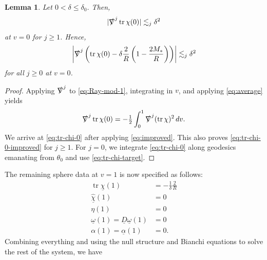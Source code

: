 \documentclass[10pt]{article}
\numberwithin{equation}{section}
\theoremstyle{plain}
\newtheorem{lem}{Lemma}[section]
\theoremstyle{definition}
\newcommand{\les}{\lesssim}
\newcommand{\tr}{\operatorname{tr}}
\begin{document}
\begin{lem}
    Let $0<\delta\leq \delta_0$. Then,
   \begin{equation}
       |\slashed\nabla^j \tr\chi(0)|\les_j \delta^2\label{eq:tr-chi-0}
   \end{equation}
   at $v=0$ for $j\ge 1$. Hence,
   \begin{equation}
       \left|\slashed\nabla^j\left(\tr\chi(0)-\delta\frac{2}{R}\left(1-\frac{2M_*}{R}\right)\right)\right|\les_j \delta^2\label{eq:tr-chi-0-improved}
   \end{equation}
   for all $j\ge 0$ at $v=0$.
\end{lem}
\begin{proof}
Applying $\slashed\nabla^j$ to \eqref{eq:Ray-mod-1}, integrating in $v$, and applying \eqref{eq:average} yields 
\begin{equation*}\slashed\nabla^ j \tr\chi(0) = -\tfrac 12 \int_0^1 \slashed \nabla^j (\tr\chi)^2\,dv.\end{equation*}
We arrive at \eqref{eq:tr-chi-0} after applying \eqref{eq:improved}. This also proves \eqref{eq:tr-chi-0-improved} for $j\ge 1$. For $j=0$, we integrate \eqref{eq:tr-chi-0} along geodesics emanating from $\theta_0$ and use \eqref{eq:tr-chi-target}.
\end{proof} 

The remaining sphere data at $v=1$ is now specified as follows:
\begin{align}
\nonumber \tr\underline\chi(1) &= -\frac{1}{\delta}\frac{2}{R}\\
\nonumber\hat{\underline\chi}(1)&=0\\
\nonumber\eta(1)&=0\\
\nonumber\underline\omega(1) =\underline D\underline\omega(1)& = 0\\
\nonumber\alpha(1) =\underline\alpha(1)&=0.
\end{align}
Combining everything and using the null structure and Bianchi equations to solve the rest of the system, we have 
\end{document}
